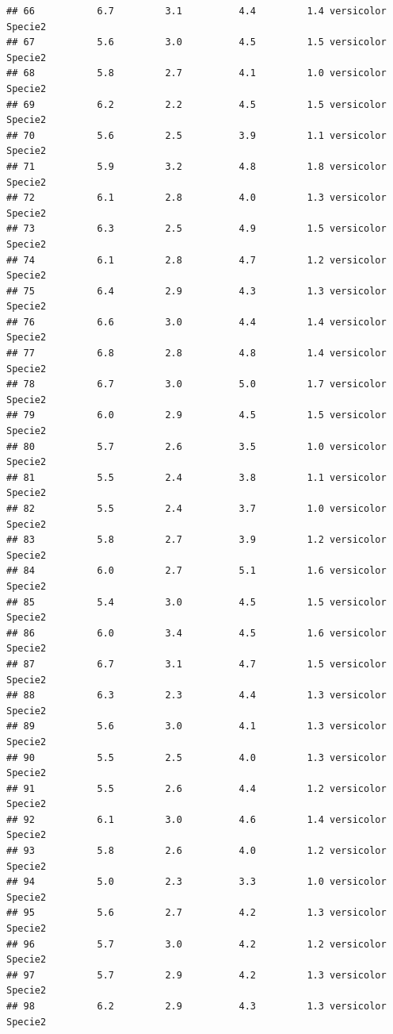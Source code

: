 \documentclass[
]{book}
\begin{document}
\begin{verbatim}
## 66           6.7         3.1          4.4         1.4 versicolor    Specie2
## 67           5.6         3.0          4.5         1.5 versicolor    Specie2
## 68           5.8         2.7          4.1         1.0 versicolor    Specie2
## 69           6.2         2.2          4.5         1.5 versicolor    Specie2
## 70           5.6         2.5          3.9         1.1 versicolor    Specie2
## 71           5.9         3.2          4.8         1.8 versicolor    Specie2
## 72           6.1         2.8          4.0         1.3 versicolor    Specie2
## 73           6.3         2.5          4.9         1.5 versicolor    Specie2
## 74           6.1         2.8          4.7         1.2 versicolor    Specie2
## 75           6.4         2.9          4.3         1.3 versicolor    Specie2
## 76           6.6         3.0          4.4         1.4 versicolor    Specie2
## 77           6.8         2.8          4.8         1.4 versicolor    Specie2
## 78           6.7         3.0          5.0         1.7 versicolor    Specie2
## 79           6.0         2.9          4.5         1.5 versicolor    Specie2
## 80           5.7         2.6          3.5         1.0 versicolor    Specie2
## 81           5.5         2.4          3.8         1.1 versicolor    Specie2
## 82           5.5         2.4          3.7         1.0 versicolor    Specie2
## 83           5.8         2.7          3.9         1.2 versicolor    Specie2
## 84           6.0         2.7          5.1         1.6 versicolor    Specie2
## 85           5.4         3.0          4.5         1.5 versicolor    Specie2
## 86           6.0         3.4          4.5         1.6 versicolor    Specie2
## 87           6.7         3.1          4.7         1.5 versicolor    Specie2
## 88           6.3         2.3          4.4         1.3 versicolor    Specie2
## 89           5.6         3.0          4.1         1.3 versicolor    Specie2
## 90           5.5         2.5          4.0         1.3 versicolor    Specie2
## 91           5.5         2.6          4.4         1.2 versicolor    Specie2
## 92           6.1         3.0          4.6         1.4 versicolor    Specie2
## 93           5.8         2.6          4.0         1.2 versicolor    Specie2
## 94           5.0         2.3          3.3         1.0 versicolor    Specie2
## 95           5.6         2.7          4.2         1.3 versicolor    Specie2
## 96           5.7         3.0          4.2         1.2 versicolor    Specie2
## 97           5.7         2.9          4.2         1.3 versicolor    Specie2
## 98           6.2         2.9          4.3         1.3 versicolor    Specie2

\end{verbatim}
\end{document}
